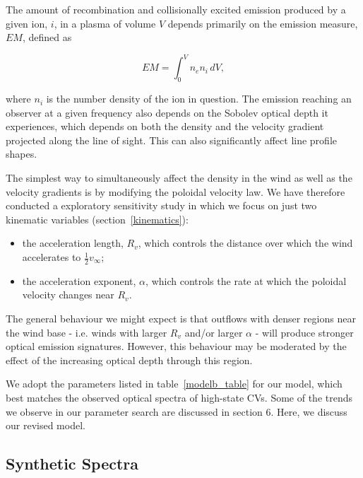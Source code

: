 \documentclass[preprint, a4paper, 11pt]{aastex}
\begin{document}
The amount of recombination and collisionally excited emission
produced by a given ion, $i$, in a plasma of volume $V$ depends
primarily on the emission measure, $EM$, defined as 

\begin{equation}
EM=\int^V_0 n_e n_i \,dV,
\end{equation}

where $n_i$ is the number density of the ion in question.    
The emission reaching an observer at a given frequency also depends on
the Sobolev optical depth it experiences, which depends on both the
density and the velocity gradient projected along the line of
sight. This can also significantly affect line profile shapes.

The simplest way to simultaneously affect the density in the wind as
well as the velocity gradients is by modifying the poloidal velocity
law. We have therefore conducted a exploratory sensitivity study in
which we focus on just two kinematic variables (section~\ref{kinematics}):

\begin{itemize}
 	\item the acceleration length, $R_v$, which controls the
        distance over which the wind accelerates to $\frac{1}{2}v_{\infty}$;
 	\item the acceleration exponent, $\alpha$, which controls the rate 
 	at which the poloidal velocity changes near $R_v$.
\end{itemize} 

The general behaviour we might expect is that outflows with denser
regions near the wind base - i.e. winds with larger $R_{v}$ and/or
larger $\alpha$ - will produce stronger optical emission signatures. 
However, this behaviour may be moderated by the effect of the increasing
optical depth through this region.

We adopt the parameters listed in table~\ref{modelb_table}
for our model, which best matches the observed optical spectra
of high-state CVs. Some of the trends we observe in our 
parameter search are discussed in section 6.
Here, we discuss our revised model.

\subsection{Synthetic Spectra}
\end{document}
